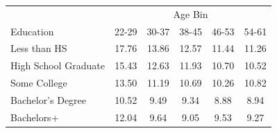\begin{tabular}{lccccc}
\hline\hline
 & \multicolumn{5}{c}{Age Bin} \\
Education & 22-29 & 30-37 & 38-45 & 46-53 & 54-61 \\
\hline
Less than HS&17.76&13.86&12.57&11.44&11.26\\
High School Graduate&15.43&12.63&11.93&10.70&10.52\\
Some College&13.50&11.19&10.69&10.26&10.82\\
Bachelor's Degree&10.52&9.49&9.34&8.88&8.94\\
Bachelors+&12.04&9.64&9.05&9.53&9.27\\
\hline\hline
\end{tabular}
